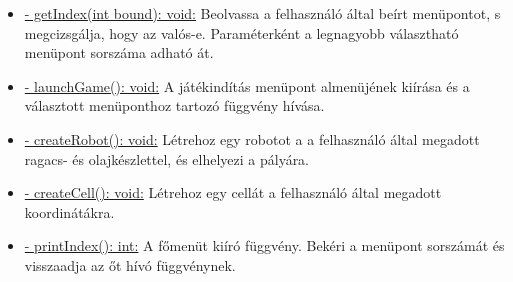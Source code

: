 \begin{itemize}
\begin{itemize}
		\item \underline{- getIndex(int bound): void:} Beolvassa a felhasználó által beírt menüpontot, s megcizsgálja, hogy az valós-e. Paraméterként a legnagyobb választható menüpont sorszáma adható át.
		\item \underline{- launchGame(): void:} A játékindítás menüpont almenüjének kiírása és a választott menüponthoz tartozó függvény hívása.
		\item  \underline{- createRobot(): void:} Létrehoz egy robotot a a felhasználó által megadott ragacs- és olajkészlettel, és elhelyezi a pályára.
		\item \underline{- createCell(): void:} Létrehoz egy cellát a felhasználó által megadott koordinátákra. 
		\item \underline{- printIndex(): int:} A főmenüt kiíró függvény. Bekéri a menüpont sorszámát és visszaadja az őt hívó függvénynek.
		
	\end{itemize}
\end{itemize}

